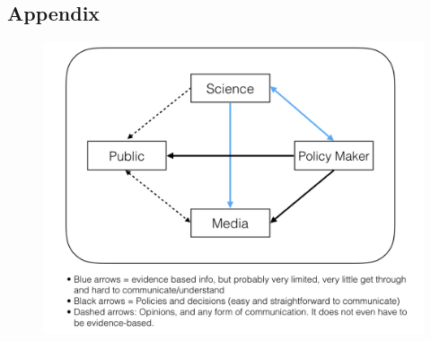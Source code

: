 

\subsection*{Appendix}

\begin{center}
\begin{figure}[ht!]
\includegraphics[scale = 0.5]{./figures/flow.png}
\end{figure}
\end{center}

